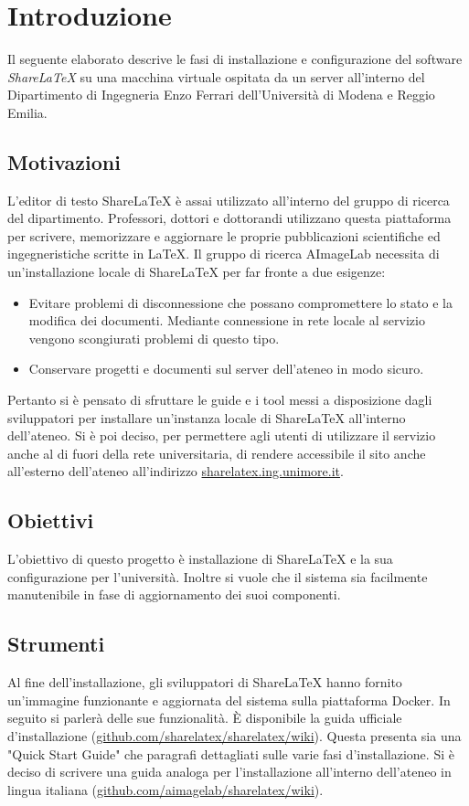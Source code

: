 \chapter{Introduzione}
\label{Introduzione}
\thispagestyle{empty}

Il seguente elaborato descrive le fasi di installazione e configurazione del software \emph{ShareLaTeX} su una macchina virtuale ospitata da un server all'interno del Dipartimento di Ingegneria Enzo Ferrari dell'Università di Modena e Reggio Emilia.

\section{Motivazioni}
L'editor di testo ShareLaTeX è assai utilizzato all'interno del gruppo di ricerca del dipartimento. Professori, dottori e dottorandi utilizzano questa piattaforma per scrivere, memorizzare e aggiornare le proprie pubblicazioni scientifiche ed ingegneristiche scritte in \LaTeX. Il gruppo di ricerca AImageLab necessita di un'installazione locale di ShareLaTeX per far fronte a due esigenze:
\begin{itemize}
    \item Evitare problemi di disconnessione che possano compromettere lo stato e la modifica dei documenti. Mediante connessione in rete locale al servizio vengono scongiurati problemi di questo tipo.
    \item Conservare progetti e documenti sul server dell'ateneo in modo sicuro.
\end{itemize}
Pertanto si è pensato di sfruttare le guide e i tool messi a disposizione dagli sviluppatori per installare un'instanza locale di ShareLaTeX all'interno dell'ateneo. Si è poi deciso, per permettere agli utenti di utilizzare il servizio anche al di fuori della rete universitaria, di rendere accessibile il sito anche all'esterno dell'ateneo all'indirizzo \url{sharelatex.ing.unimore.it}.

\section{Obiettivi}
L'obiettivo di questo progetto è installazione di ShareLaTeX e la sua configurazione per l'università. Inoltre si vuole che il sistema sia facilmente manutenibile in fase di aggiornamento dei suoi componenti.

\section{Strumenti}
Al fine dell'installazione, gli sviluppatori di ShareLaTeX hanno fornito un'immagine funzionante e aggiornata del sistema sulla piattaforma Docker. In seguito si parlerà delle sue funzionalità. È disponibile la guida ufficiale d'installazione (\url{github.com/sharelatex/sharelatex/wiki}). Questa presenta sia una "Quick Start Guide" che paragrafi dettagliati sulle varie fasi d'installazione. Si è deciso di scrivere una guida analoga per l'installazione all'interno dell'ateneo in lingua italiana (\url{github.com/aimagelab/sharelatex/wiki}).

